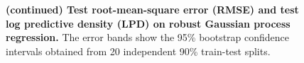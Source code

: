 \begin{figure}[H]
  \vspace{0.05in}\\
   \vspace{0.05in}\\
  \caption{\textbf{(continued) Test root-mean-square error (RMSE) and test log predictive density (LPD) on robust Gaussian process regression.}
  The error bands show the 95\% bootstrap confidence intervals obtained from 20 independent 90\% train-test splits.
  }
\end{figure}

